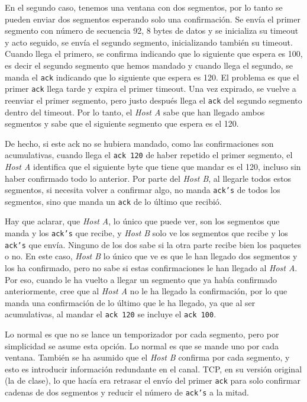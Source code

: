 \documentclass[10pt,a4paper,spanish]{report}
\begin{document}
En el segundo caso, tenemos una ventana con dos segmentos, por lo tanto se pueden enviar dos segmentos esperando solo una confirmación. Se envía el primer segmento con número de secuencia 92, 8 bytes de datos y se inicializa su timeout y acto seguido, se envía el segundo segmento, inicializando también su timeout. Cuando llega el primero, se confirma indicando que lo siguiente que espera es 100, es decir el segundo segmento que hemos mandado y cuando llega el segundo, se manda el \texttt{ack} indicando que lo siguiente que espera es 120. El problema es que el primer \texttt{ack} llega tarde y expira el primer timeout. Una vez expirado, se vuelve a reenviar el primer segmento, pero justo después llega el \texttt{ack} del segundo segmento dentro del timeout. Por lo tanto, el \textit{Host A} sabe que han llegado ambos segmentos y sabe que el siguiente segmento que espera es el 120.

De hecho, si este ack no se hubiera mandado, como las confirmaciones son acumulativas, cuando llega el \texttt{ack 120} de haber repetido el primer segmento, el \textit{Host A} identifica que el siguiente byte que tiene que mandar es el 120, incluso sin haber confirmado todo lo anterior. Por parte del \textit{Host B}, al llegarle todos estos segmentos, si necesita volver a confirmar algo, no manda \texttt{ack's} de todos los segmentos, sino que manda un \texttt{ack} de lo último que recibió. 

Hay que aclarar, que \textit{Host A}, lo único que puede ver, son los segmentos que manda y los \texttt{ack's} que recibe, y \textit{Host B} solo ve los segmentos que recibe y los \texttt{ack's} que envía. Ninguno de los dos sabe si la otra parte recibe bien los paquetes o no. En este caso, \textit{Host B} lo único que ve es que le han llegado dos segmentos y los ha confirmado, pero no sabe si estas confirmaciones le han llegado al \textit{Host A}. Por eso, cuando le ha vuelto a llegar un segmento que ya había confirmado anteriormente, cree que al \textit{Host A} no le ha llegado la confirmación, por lo que manda una confirmación de lo último que le ha llegado, ya que al ser acumulativas, al mandar el \texttt{ack 120} se incluye el \texttt{ack 100}. 

Lo normal es que no se lance un temporizador por cada segmento, pero por simplicidad se asume esta opción. Lo normal es que se mande uno por cada ventana. También se ha asumido que el \textit{Host B} confirma por cada segmento, y esto es introducir información redundante en el canal. TCP, en su versión original (la de clase), lo que hacía era retrasar el envío del primer \texttt{ack} para solo confirmar cadenas de dos segmentos y reducir el número de \texttt{ack's} a la mitad. 
\end{document}
